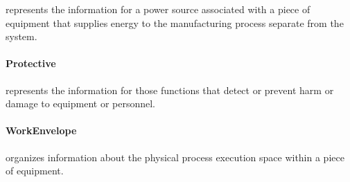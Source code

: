  represents the information for a power source associated with a piece of equipment that supplies energy to the manufacturing process separate from the  system.


\paragraph{Protective}\mbox{}
\label{sec:Protective}


 represents the information for those functions that detect or prevent harm or damage to equipment or personnel.


\paragraph{WorkEnvelope}\mbox{}
\label{sec:WorkEnvelope}


 organizes information about the physical process execution space within a piece of equipment.

